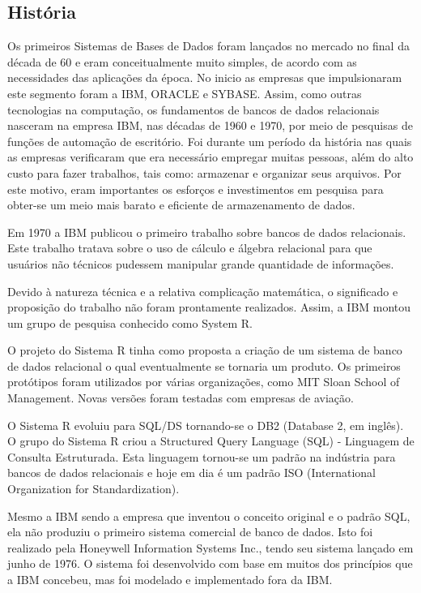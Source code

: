 \documentclass{article}
\begin{document}
\subsection{História}
Os primeiros Sistemas de Bases de Dados foram lançados no mercado no final da década de 60 e eram conceitualmente muito simples, de acordo com as necessidades das aplicações da época. No inicio as empresas que impulsionaram este segmento foram a IBM, ORACLE e SYBASE. Assim, como outras tecnologias na computação, os fundamentos de bancos de dados relacionais nasceram na empresa IBM, nas décadas de 1960 e 1970, por meio de pesquisas de funções de automação de escritório. Foi durante um período da história nas quais as empresas verificaram que era necessário empregar muitas pessoas, além do alto custo para fazer trabalhos, tais como: armazenar e organizar seus arquivos. Por este motivo, eram importantes os esforços e investimentos em pesquisa para obter-se um meio mais barato e eficiente de armazenamento de dados.

Em 1970 a IBM publicou o primeiro trabalho sobre bancos de dados relacionais. Este trabalho tratava sobre o uso de cálculo e álgebra relacional para que usuários não técnicos pudessem manipular grande quantidade de informações.

Devido à natureza técnica e a relativa complicação matemática, o significado e proposição do trabalho não foram prontamente realizados. Assim, a IBM montou um grupo de pesquisa conhecido como System R.

O projeto do Sistema R tinha como proposta a criação de um sistema de banco de dados relacional o qual eventualmente se tornaria um produto. Os primeiros protótipos foram utilizados por várias organizações, como MIT Sloan School of Management. Novas versões foram testadas com empresas de aviação.

O Sistema R evoluiu para SQL/DS tornando-se o DB2 (Database 2, em inglês). O grupo do Sistema R criou a Structured Query Language (SQL) - Linguagem de Consulta Estruturada. Esta linguagem tornou-se um padrão na indústria para bancos de dados relacionais e hoje em dia é um padrão ISO (International Organization for Standardization).

Mesmo a IBM sendo a empresa que inventou o conceito original e o padrão SQL, ela não produziu o primeiro sistema comercial de banco de dados. Isto foi realizado pela Honeywell Information Systems Inc., tendo seu sistema lançado em junho de 1976. O sistema foi desenvolvido com base em muitos dos princípios que a IBM concebeu, mas foi modelado e implementado fora da IBM.
\end{document}
